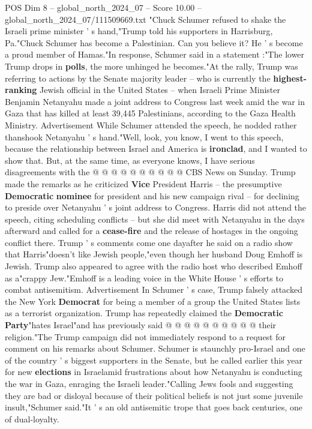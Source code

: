 \begin{textsample}{POS Dim 8 – global\_north\_2024\_07 – Score 10.00 – global\_north\_2024\_07/111509669.txt}  \label{ex:f8_pos_050}
"Chuck Schumer refused to shake the Israeli prime minister ' s hand,"Trump told his supporters in Harrisburg, Pa."Chuck Schumer has become a Palestinian.
Can you believe it?
He ' s become a proud member of Hamas."In response, Schumer said in a statement :"The lower Trump drops in \textbf{polls}, the more unhinged he becomes."At the rally, Trump was referring to actions by the Senate majority leader -- who is currently the \textbf{highest-ranking} Jewish official in the United States -- when Israeli Prime Minister Benjamin Netanyahu made a joint address to Congress last week amid the war in Gaza that has killed at least 39,445 Palestinians, according to the Gaza Health Ministry.
Advertisement While Schumer attended the speech, he nodded rather thanshook Netanyahu ' s hand."Well, look, you know, I went to this speech, because the relationship between Israel and America is \textbf{ironclad}, and I wanted to show that.
But, at the same time, as everyone knows, I have serious disagreements with the @ @ @ @ @ @ @ @ @ @ CBS News on Sunday.
Trump made the remarks as he criticized \textbf{Vice} President Harris -- the presumptive \textbf{Democratic} \textbf{nominee} for president and his new campaign rival -- for declining to preside over Netanyahu ' s joint address to Congress.
Harris did not attend the speech, citing scheduling conflicts -- but she did meet with Netanyahu in the days afterward and called for a \textbf{cease-fire} and the release of hostages in the ongoing conflict there.
Trump ' s comments come one dayafter he said on a radio show that Harris"doesn't like Jewish people,"even though her husband Doug Emhoff is Jewish.
Trump also appeared to agree with the radio host who described Emhoff as a"crappy Jew."Emhoff is a leading voice in the White House ' s efforts to combat antisemitism.
Advertisement In Schumer ' s case, Trump falsely attacked the New York \textbf{Democrat} for being a member of a group the United States lists as a terrorist organization.
Trump has repeatedly claimed the \textbf{Democratic} \textbf{Party}"hates Israel"and has previously said @ @ @ @ @ @ @ @ @ @ their religion."The Trump campaign did not immediately respond to a request for comment on his remarks about Schumer.
Schumer is staunchly pro-Israel and one of the country ' s biggest supporters in the Senate, but he called earlier this year for new \textbf{elections} in Israelamid frustrations about how Netanyahu is conducting the war in Gaza, enraging the Israeli leader."Calling Jews fools and suggesting they are bad or disloyal because of their political beliefs is not just some juvenile insult,"Schumer said."It ' s an old antisemitic trope that goes back centuries, one of dual-loyalty.

\end{textsample}
